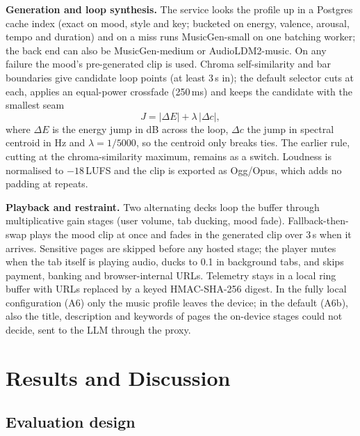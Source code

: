 \documentclass[conference]{IEEEtran}
\begin{document}
\textbf{Generation and loop synthesis.} The service looks the profile up in a
Postgres cache index (exact on mood, style and key; bucketed on energy, valence,
arousal, tempo and duration) and on a miss runs MusicGen-small on one batching
worker; the back end can also be MusicGen-medium or AudioLDM2-music. On any
failure the mood's pre-generated clip is used. Chroma self-similarity
\cite{marmoret} and bar boundaries give candidate loop points (at least 3\,s in);
the default selector cuts at each, applies an equal-power crossfade (250\,ms) and
keeps the candidate with the smallest seam
\begin{equation}
J = |\Delta E| + \lambda\,|\Delta c| ,
\label{eq:seam}
\end{equation}
where $\Delta E$ is the energy jump in dB across the loop, $\Delta c$ the jump in
spectral centroid in Hz and $\lambda = 1/5000$, so the centroid only breaks ties.
The earlier rule, cutting at the chroma-similarity maximum, remains as a switch.
Loudness is normalised to $-18$\,LUFS \cite{ebu128} and the clip is exported as
Ogg/Opus, which adds no padding at repeats.

\textbf{Playback and restraint.} Two alternating decks loop the buffer through
multiplicative gain stages (user volume, tab ducking, mood fade). Fallback-then-swap
plays the mood clip at once and fades in the generated clip over 3\,s when it
arrives. Sensitive pages are skipped before any hosted stage; the player mutes
when the tab itself is playing audio, ducks to 0.1 in background tabs, and skips
payment, banking and browser-internal URLs. Telemetry stays in a local ring buffer
with URLs replaced by a keyed HMAC-SHA-256 digest. In the fully local
configuration (A6) only the music profile leaves the device; in the default
(A6b), also the title, description and keywords of pages the on-device stages
could not decide, sent to the LLM through the proxy.

\section{Results and Discussion}
\label{sec:results}

\subsection{Evaluation design}
\label{sec:res-design}
\end{document}
